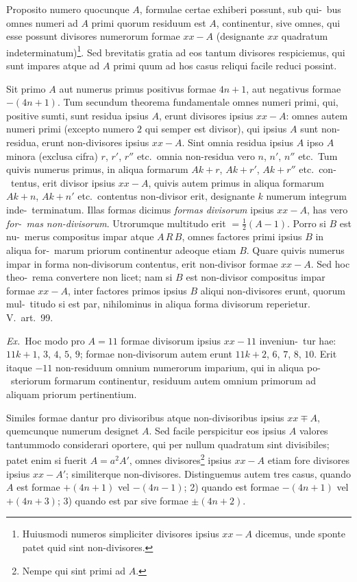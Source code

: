 \documentclass[12pt,a4paper]{article}
\theoremstyle{plain}
\theoremstyle{definition}
\theoremstyle{remark}
\begin{document}
Proposito numero quocunque $A$, formulae certae exhiberi possunt, sub qui-\ bus omnes numeri ad $A$ primi quorum residuum est $A$, continentur, sive omnes,
qui esse possunt divisores numerorum formae $xx - A$ (designante $xx$ quadratum
indeterminatum)\footnote{Huiusmodi numeros simpliciter divisores ipsius $xx - A$ dicemus, unde sponte patet quid sint non-divisores.}. Sed brevitatis gratia ad eos tantum divisores respiciemus, qui
sunt impares atque ad $A$ primi quum ad hos casus reliqui facile reduci possint.

Sit primo $A$ aut numerus primus positivus formae $4n+1$, aut negativus
formae $-(4n+1)$. Tum secundum theorema fundamentale omnes numeri primi,
qui, positive sumti, sunt residua ipsius $A$, erunt divisores ipsius $xx - A$: omnes
autem numeri primi (excepto numero $2$ qui semper est divisor), qui ipsius $A$ sunt
non-residua, erunt non-divisores ipsius $xx - A$. Sint omnia residua ipsius $A$ ipso
$A$ minora (exclusa cifra) $r$, $r'$, $r''$ etc.\ omnia non-residua vero $n$, $n'$, $n''$ etc.\ Tum
quivis numerus primus, in aliqua formarum $Ak + r$, $Ak + r'$, $Ak + r''$ etc.\ con-\ tentus, erit divisor ipsius $xx - A$, quivis autem primus in aliqua formarum $Ak + n$,
$Ak + n'$ etc.\ contentus non-divisor erit, designante $k$ numerum integrum inde-\ terminatum. Illas formas dicimus \emph{formas divisorum} ipsius $xx - A$, has vero \emph{for-\ mas non-divisorum}. Utrorumque multitudo erit $= \frac{1}{2}(A-1)$. Porro si $B$ est nu-\ merus compositus impar atque $A \, R \, B$, omnes factores primi ipsius $B$ in aliqua for-\ marum priorum continentur adeoque etiam $B$. Quare quivis numerus impar in
forma non-divisorum contentus, erit non-divisor formae $xx - A$. Sed hoc theo-\ rema convertere non licet; nam si $B$ est non-divisor compositus impar formae
$xx - A$, inter factores primos ipsius $B$ aliqui non-divisores erunt, quorum mul-\ titudo si est par, nihilominus in aliqua forma divisorum reperietur. V.\ art.~99.

\emph{Ex.}\ Hoc modo pro $A = 11$ formae divisorum ipsius $xx - 11$ inveniun-\ tur hae: $11k + 1$, $3$, $4$, $5$, $9$; formae non-divisorum autem erunt $11k + 2$, $6$, $7$, $8$, $10$.
Erit itaque $-11$ non-residuum omnium numerorum imparium, qui in aliqua po-\ steriorum formarum continentur, residuum autem omnium primorum ad aliquam
priorum pertinentium.

Similes formae dantur pro divisoribus atque non-divisoribus ipsius $xx \mp A$,
quemcunque numerum designet $A$. Sed facile perspicitur eos ipsius $A$ valores
tantummodo considerari oportere, qui per nullum quadratum sint divisibiles; patet
enim si fuerit $A = a^2 A'$, omnes divisores\footnote{Nempe qui sint primi ad $A$.} ipsius $xx - A$ etiam fore divisores
ipsius $xx - A'$; similiterque non-divisores. Distinguemus autem tres casus,
quando $A$ est formae $+(4n+1)$ vel $-(4n-1)$; 2) quando est formae
$-(4n+1)$ vel $+(4n+3)$; 3) quando est par sive formae $\pm (4n+2)$.
\end{document}
